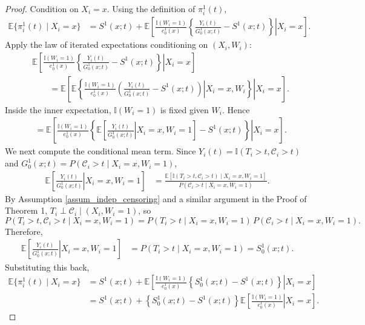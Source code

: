 \documentclass{article}
\newenvironment{proofof}[1]
{\renewcommand{\proofname}{Proof of #1}\begin{proof}}
{\end{proof}}
\begin{document}
\begin{proofof} {Theorem~\ref{thm:DR}:}
Condition on $X_i=x$. Using the definition of $\pi_i^1(t)$,
\begin{align*}
\mathbb{E}\{\pi_i^1(t)\mid X_i=x\}
&=
S^1(x;t)
+
\mathbb{E}\!\left[
\left.
\frac{\mathbb{I}(W_i=1)}{e_0^1(x)}
\left\{
\frac{Y_i(t)}{G_0^1(x;t)}-S^1(x;t)
\right\}
\right|X_i=x
\right].
\end{align*}
Apply the law of iterated expectations conditioning on $(X_i,W_i)$:
\begin{align*}
&\mathbb{E}\!\left[
\left.
\frac{\mathbb{I}(W_i=1)}{e_0^1(x)}
\left\{
\frac{Y_i(t)}{G_0^1(x;t)}-S^1(x;t)
\right\}
\right|X_i=x
\right]\\
&\qquad=
\mathbb{E}\!\left[
\left.
\mathbb{E}\!\left\{
\left.
\frac{\mathbb{I}(W_i=1)}{e_0^1(x)}
\left(
\frac{Y_i(t)}{G_0^1(x;t)}-S^1(x;t)
\right)
\right|X_i=x,W_i
\right\}
\right|X_i=x
\right].
\end{align*}
Inside the inner expectation, $\mathbb{I}(W_i=1)$ is fixed given $W_i$. Hence
\begin{align*}
&=
\mathbb{E}\!\left[
\left.
\frac{\mathbb{I}(W_i=1)}{e_0^1(x)}
\left\{
\mathbb{E}\!\left[\left.\frac{Y_i(t)}{G_0^1(x;t)}\right|X_i=x,W_i=1\right]
-
S^1(x;t)
\right\}
\right|X_i=x
\right].
\end{align*}
We next compute the conditional mean term. Since $Y_i(t)=\mathbb{I}(T_i>t,\mathcal C_i>t)$ and $G_0^1(x;t)=P(\mathcal C_i>t\mid X_i=x,W_i=1)$,
\begin{align*}
\mathbb{E}\!\left[\left.\frac{Y_i(t)}{G_0^1(x;t)}\right|X_i=x,W_i=1\right]
&=
\frac{
\mathbb{E}\!\left[\mathbb{I}(T_i>t,\mathcal C_i>t)\mid X_i=x,W_i=1\right]
}{
P(\mathcal C_i>t\mid X_i=x,W_i=1)
}.
\end{align*}
By Assumption \ref{assum_indep_censoring}   and a similar argument in the Proof of Theorem 1,
$T_i\perp \mathcal C_i\mid (X_i,W_i=1)$, so
\[
P(T_i>t,\mathcal C_i>t\mid X_i=x,W_i=1)
=
P(T_i>t\mid X_i=x,W_i=1)\,P(\mathcal C_i>t\mid X_i=x,W_i=1).
\]
Therefore,
\begin{align*}
\mathbb{E}\!\left[\left.\frac{Y_i(t)}{G_0^1(x;t)}\right|X_i=x,W_i=1\right]
&=
P(T_i>t\mid X_i=x,W_i=1)
=
S_0^1(x;t).
\end{align*}
Substituting this back,
\begin{align*}
\mathbb{E}\{\pi_i^1(t)\mid X_i=x\}
&=
S^1(x;t)
+
\mathbb{E}\!\left[
\left.
\frac{\mathbb{I}(W_i=1)}{e_0^1(x)}
\left\{
S_0^1(x;t)-S^1(x;t)
\right\}
\right|X_i=x
\right]\\
&=
S^1(x;t)
+
\left\{
S_0^1(x;t)-S^1(x;t)
\right\}
\mathbb{E}\!\left[\left.\frac{\mathbb{I}(W_i=1)}{e_0^1(x)}\right|X_i=x\right].

\end{align*}
\end{proofof}
\end{document}
